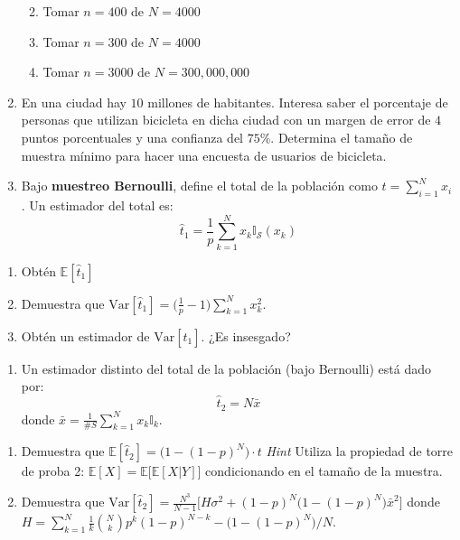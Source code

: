 \documentclass[
]{book}
\providecommand{\tightlist}{%
  \setlength{\itemsep}{0pt}\setlength{\parskip}{0pt}}
\begin{document}
\begin{enumerate}
  \begin{enumerate}
  \def\labelenumii{\alph{enumii}.}
  \tightlist
  \item
    Tomar \(n = 400\) de \(N = 4000\)
  \item
    Tomar \(n = 300\) de \(N = 4000\)
  \item
    Tomar \(n = 3000\) de \(N = 300,000,000\)
  \end{enumerate}
\item
  En una ciudad hay \(10\) millones de habitantes. Interesa saber el porcentaje de personas que utilizan bicicleta en dicha ciudad con un margen de error de \(4\) puntos porcentuales y una confianza del \(75\%\). Determina el tamaño de muestra mínimo para hacer una encuesta de usuarios de bicicleta.
\item
  Bajo \textbf{muestreo Bernoulli}, define el total de la población como \(t = \sum_{i=1}^{N} x_i\). Un estimador del total es:
  \[
  \hat{t}_1 = \dfrac{1}{p} \sum_{k=1}^{N} x_k \mathbb{I}_{\mathcal{S}}(x_k)
  \]
\end{enumerate}

\begin{enumerate}
\def\labelenumi{\alph{enumi}.}
\tightlist
\item
  Obtén \(\mathbb{E}[\hat{t}_1]\)
\item
  Demuestra que \(\textrm{Var}[\hat{t}_1] = \big(\frac{1}{p}-1 \big) \sum_{k=1}^{N} x_k^2\).
\item
  Obtén un estimador de \(\textrm{Var}[\hat{t}_1]\). ¿Es insesgado?
\end{enumerate}

\begin{enumerate}
\def\labelenumi{\arabic{enumi}.}
\setcounter{enumi}{9}
\tightlist
\item
  Un estimador distinto del total de la población (bajo Bernoulli) está dado por:
  \[
  \hat{t}_2 = N \bar{x} 
  \]
  donde \(\bar{x} = \frac{1}{\# S} \sum\limits_{k=1}^{N} x_k \mathbb{I}_k\).
\end{enumerate}

\begin{enumerate}
\def\labelenumi{\alph{enumi}.}
\tightlist
\item
  Demuestra que \(\mathbb{E}[\hat{t}_2] = \big(1 - (1-p)^N\big) \cdot t\) \emph{Hint} Utiliza la propiedad de torre de proba 2: \(\mathbb{E}[X] = \mathbb{E}\big[\mathbb{E}[X| Y ]\big]\) condicionando en el tamaño de la muestra.
\item
  Demuestra que \(\textrm{Var}[\hat{t}_2] = \frac{N^3}{N-1} \Big[ H \sigma^2 + (1-p)^N \Big( 1 - (1 - p)^N \Big) \bar{x}^2 \Big]\) donde \(H = \sum_{k=1}^{N} \frac{1}{k} \binom{N}{k} p^k (1-p)^{N-k} - \big(1 - (1-p)^N\big)/N\).
\end{enumerate}
\end{document}
